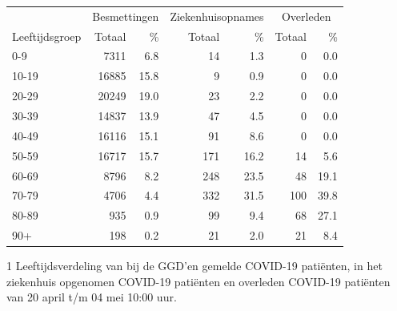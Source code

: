 \documentclass[
  english,
  man,floatsintext]{apa6}
\begin{document}
\begin{table}
\centering\begingroup\fontsize{11}{13}\selectfont

\begin{threeparttable}
\begin{tabular}{lrrrrrr}
\toprule
\multicolumn{1}{c}{ } & \multicolumn{2}{c}{Besmettingen} & \multicolumn{2}{c}{Ziekenhuisopnames} & \multicolumn{2}{c}{Overleden} \\
\cmidrule(l{3pt}r{3pt}){2-3} \cmidrule(l{3pt}r{3pt}){4-5} \cmidrule(l{3pt}r{3pt}){6-7}
Leeftijdsgroep & Totaal & \% & Totaal & \% & Totaal & \%\\
\midrule
0-9 & 7311 & 6.8 & 14 & 1.3 & 0 & 0.0\\
10-19 & 16885 & 15.8 & 9 & 0.9 & 0 & 0.0\\
20-29 & 20249 & 19.0 & 23 & 2.2 & 0 & 0.0\\
30-39 & 14837 & 13.9 & 47 & 4.5 & 0 & 0.0\\
40-49 & 16116 & 15.1 & 91 & 8.6 & 0 & 0.0\\
50-59 & 16717 & 15.7 & 171 & 16.2 & 14 & 5.6\\
60-69 & 8796 & 8.2 & 248 & 23.5 & 48 & 19.1\\
70-79 & 4706 & 4.4 & 332 & 31.5 & 100 & 39.8\\
80-89 & 935 & 0.9 & 99 & 9.4 & 68 & 27.1\\
90+ & 198 & 0.2 & 21 & 2.0 & 21 & 8.4\\
\bottomrule
\end{tabular}
\begin{tablenotes}
\item[1] Leeftijdsverdeling van bij de GGD’en gemelde COVID-19 patiënten, in het ziekenhuis opgenomen COVID-19 patiënten en overleden COVID-19 patiënten van 20 april t/m 04 mei 10:00 uur.
\end{tablenotes}
\end{threeparttable}
\endgroup{}
\end{table}

\newpage
\end{document}
